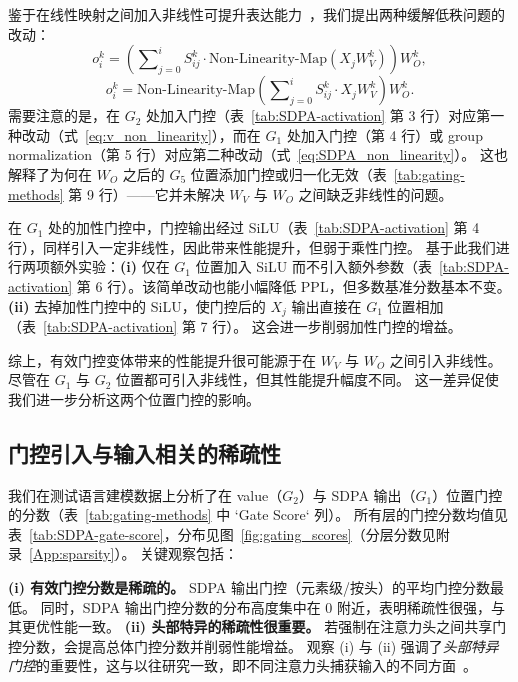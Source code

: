 \documentclass{article} %
\begin{document}
鉴于在线性映射之间加入非线性可提升表达能力~\citep{montufar2014numberlinearregionsdeep}，我们提出两种缓解低秩问题的改动：
\begin{equation}
o^k_i = \left(\sum\nolimits_{j=0}^{i} S^k_{ij}  \cdot \text{Non-Linearity-Map}(X_j W_V^k) \right) W^k_O,
\label{eq:v_non_linearity}
\end{equation}
\begin{equation}
o^k_i = \text{Non-Linearity-Map}\left(\sum\nolimits_{j=0}^{i} S^k_{ij}  \cdot X_j W_V^k \right) W^k_O.
\label{eq:SDPA_non_linearity}
\end{equation}
需要注意的是，在 $G_2$ 处加入门控（表~\ref{tab:SDPA-activation} 第 3 行）对应第一种改动（式~\ref{eq:v_non_linearity}），而在 $G_1$ 处加入门控（第 4 行）或 group normalization（第 5 行）对应第二种改动（式~\ref{eq:SDPA_non_linearity}）。
这也解释了为何在 $W_O$ 之后的 $G_5$ 位置添加门控或归一化无效（表~\ref{tab:gating-methods} 第 9 行）——它并未解决 $W_V$ 与 $W_O$ 之间缺乏非线性的问题。


在 $G_1$ 处的加性门控中，门控输出经过 SiLU（表~\ref{tab:SDPA-activation} 第 4 行），同样引入一定非线性，因此带来性能提升，但弱于乘性门控。
基于此我们进行两项额外实验：\textbf{(i)} 仅在 $G_1$ 位置加入 SiLU 而不引入额外参数（表~\ref{tab:SDPA-activation} 第 6 行）。该简单改动也能小幅降低 PPL，但多数基准分数基本不变。
\textbf{(ii)} 去掉加性门控中的 SiLU，使门控后的 $X_j$ 输出直接在 $G_1$ 位置相加（表~\ref{tab:SDPA-activation} 第 7 行）。
这会进一步削弱加性门控的增益。

综上，有效门控变体带来的性能提升很可能源于在 $W_V$ 与 $W_O$ 之间引入非线性。
尽管在 $G_1$ 与 $G_2$ 位置都可引入非线性，但其性能提升幅度不同。
这一差异促使我们进一步分析这两个位置门控的影响。



\subsection{门控引入与输入相关的稀疏性}
\label{sec:sparsity}

我们在测试语言建模数据上分析了在 value（$G_2$）与 SDPA 输出（$G_1$）位置门控的分数（表~\ref{tab:gating-methods} 中 `Gate Score` 列）。
所有层的门控分数均值见表~\ref{tab:SDPA-gate-score}，分布见图~\ref{fig:gating_scores}（分层分数见附录~\ref{App:sparsity}）。
关键观察包括：

\textbf{(i) 有效门控分数是稀疏的。} SDPA 输出门控（元素级/按头）的平均门控分数最低。
同时，SDPA 输出门控分数的分布高度集中在 0 附近，表明稀疏性很强，与其更优性能一致。
\textbf{(ii) 头部特异的稀疏性很重要。} 若强制在注意力头之间共享门控分数，会提高总体门控分数并削弱性能增益。
观察 (i) 与 (ii) 强调了\textit{头部特异门控}的重要性，这与以往研究一致，即不同注意力头捕获输入的不同方面~\citep{voita2019analyzing, wang2021spatten, olsson2022context,wang2023smarttrim}。
\end{document}
